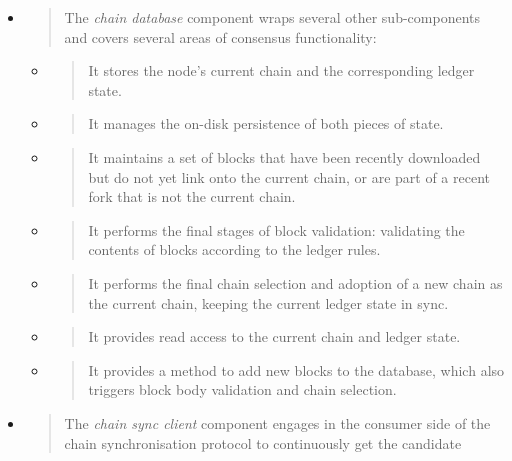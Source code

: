 \documentclass[]{article}
\begin{document}
\begin{itemize}
\item
  \begin{quote}
  The \emph{chain database} component wraps several other sub-components
  and covers several areas of consensus functionality:
  \end{quote}

  \begin{itemize}
  \item
    \begin{quote}
    It stores the node's current chain and the corresponding ledger
    state.
    \end{quote}
  \item
    \begin{quote}
    It manages the on-disk persistence of both pieces of state.
    \end{quote}
  \item
    \begin{quote}
    It maintains a set of blocks that have been recently downloaded but
    do not yet link onto the current chain, or are part of a recent fork
    that is not the current chain.
    \end{quote}
  \item
    \begin{quote}
    It performs the final stages of block validation: validating the
    contents of blocks according to the ledger rules.
    \end{quote}
  \item
    \begin{quote}
    It performs the final chain selection and adoption of a new chain as
    the current chain, keeping the current ledger state in sync.
    \end{quote}
  \item
    \begin{quote}
    It provides read access to the current chain and ledger state.
    \end{quote}
  \item
    \begin{quote}
    It provides a method to add new blocks to the database, which also
    triggers block body validation and chain selection.
    \end{quote}
  \end{itemize}
\item
  \begin{quote}
  The \emph{chain sync client} component engages in the consumer side of
  the chain synchronisation protocol to continuously get the candidate

\end{quote}
\end{itemize}
\end{document}
